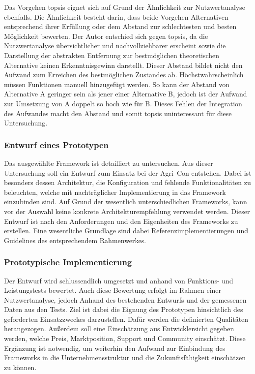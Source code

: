 Das Vorgehen \Gls{topsis} eignet sich auf Grund der Ähnlichkeit zur Nutzwertanalyse ebenfalls.
Die Ähnlichkeit besteht darin, dass beide Vorgehen Alternativen entsprechend ihrer Erfüllung oder dem Abstand zur schlechtesten und besten Möglichkeit bewerten.
Der Autor entschied sich gegen \Gls{topsis}, da die Nutzwertanalyse übersichtlicher und nachvollziehbarer erscheint sowie die Darstellung der abstrakten Entfernung zur bestmöglichen theoretischen Alternative keinen Erkenntnisgewinn darstellt.
Dieser Abstand bildet nicht den Aufwand zum Erreichen des bestmöglichen Zustandes ab. Höchstwahrscheinlich müssen Funktionen manuell hinzugefügt werden. So kann der Abstand von Alternative A geringer sein als jener einer Alternative B, jedoch ist der Aufwand zur Umsetzung von A doppelt so hoch wie für B.
Dieses Fehlen der Integration des Aufwandes macht den Abstand und somit \Gls{topsis} uninteressant für diese Untersuchung.

\subsubsection{Entwurf eines Prototypen}
Das ausgewählte Framework ist detailliert zu untersuchen.
Aus dieser Untersuchung soll ein Entwurf zum Einsatz bei der Agri~Con entstehen.
Dabei ist besonders dessen Architektur, die Konfiguration und fehlende Funktionalitäten zu beleuchten, welche mit nachträglicher Implementierung in das Framework einzubinden sind.
Auf Grund der wesentlich unterschiedlichen Frameworks, kann vor der Auswahl keine konkrete Architekturempfehlung verwendet werden. Dieser Entwurf ist nach den Anforderungen und den Eigenheiten des Frameworks zu erstellen. Eine wesentliche Grundlage sind dabei Referenzimplementierungen und Guidelines des entsprechendem Rahmenwerkes.

\subsubsection{Prototypische Implementierung}
Der Entwurf wird schlussendlich umgesetzt und anhand von Funktions- und Leistungstests bewertet.
Auch diese Bewertung erfolgt im Rahmen einer Nutzwertanalyse, jedoch Anhand des bestehenden Entwurfs und der gemessenen Daten aus den Tests.
Ziel ist dabei die Eignung des Prototypen hinsichtlich des geforderten Einsatzzweckes darzustellen.
Dafür werden die definierten Qualitäten herangezogen.
Außerdem soll eine Einschätzung aus Entwicklersicht gegeben werden, welche Preis, Marktposition, Support und Community einschätzt.
Diese Ergänzung ist notwendig, um weiterhin den Aufwand zur Einbindung des Frameworks in die Unternehmensstruktur und die Zukunftsfähigkeit einschätzen zu können.

